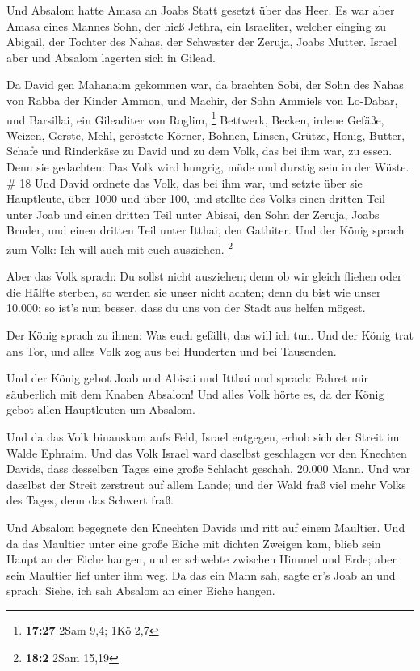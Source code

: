  Und Absalom hatte Amasa an Joabs Statt gesetzt über das
Heer. Es war aber Amasa eines Mannes Sohn, der hieß Jethra, ein
Israeliter, welcher einging zu Abigail, der Tochter des Nahas, der
Schwester der Zeruja, Joabs Mutter.  Israel aber und
Absalom lagerten sich in Gilead.

 Da David gen Mahanaim gekommen war, da brachten Sobi, der
Sohn des Nahas von Rabba der Kinder Ammon, und Machir, der Sohn Ammiels
von Lo-Dabar, und Barsillai, ein Gileaditer von Roglim, \footnote{\textbf{17:27}
  2Sam 9,4; 1Kö 2,7}  Bettwerk, Becken, irdene Gefäße,
Weizen, Gerste, Mehl, geröstete Körner, Bohnen, Linsen, Grütze,
 Honig, Butter, Schafe und Rinderkäse zu David und zu dem
Volk, das bei ihm war, zu essen. Denn sie gedachten: Das Volk wird
hungrig, müde und durstig sein in der Wüste. \# 18  Und
David ordnete das Volk, das bei ihm war, und setzte über sie Hauptleute,
über 1000 und über 100,  und stellte des Volks einen dritten
Teil unter Joab und einen dritten Teil unter Abisai, den Sohn der
Zeruja, Joabs Bruder, und einen dritten Teil unter Itthai, den Gathiter.
Und der König sprach zum Volk: Ich will auch mit euch ausziehen.
\footnote{\textbf{18:2} 2Sam 15,19}

 Aber das Volk sprach: Du sollst nicht ausziehen; denn ob
wir gleich fliehen oder die Hälfte sterben, so werden sie unser nicht
achten; denn du bist wie unser 10.000; so ist's nun besser, dass du uns
von der Stadt aus helfen mögest.

 Der König sprach zu ihnen: Was euch gefällt, das will ich
tun. Und der König trat ans Tor, und alles Volk zog aus bei Hunderten
und bei Tausenden.

 Und der König gebot Joab und Abisai und Itthai und sprach:
Fahret mir säuberlich mit dem Knaben Absalom! Und alles Volk hörte es,
da der König gebot allen Hauptleuten um Absalom.

 Und da das Volk hinauskam aufs Feld, Israel entgegen, erhob
sich der Streit im Walde Ephraim.  Und das Volk Israel ward
daselbst geschlagen vor den Knechten Davids, dass desselben Tages eine
große Schlacht geschah, 20.000 Mann.  Und war daselbst der
Streit zerstreut auf allem Lande; und der Wald fraß viel mehr Volks des
Tages, denn das Schwert fraß.

 Und Absalom begegnete den Knechten Davids und ritt auf
einem Maultier. Und da das Maultier unter eine große Eiche mit dichten
Zweigen kam, blieb sein Haupt an der Eiche hangen, und er schwebte
zwischen Himmel und Erde; aber sein Maultier lief unter ihm weg.
 Da das ein Mann sah, sagte er's Joab an und sprach: Siehe,
ich sah Absalom an einer Eiche hangen.

